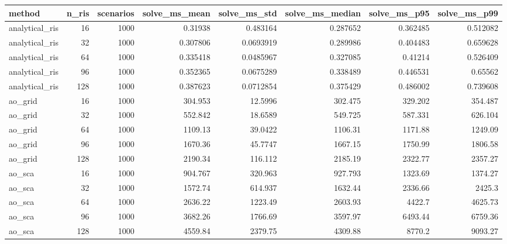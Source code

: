 \begin{tabular}{lrrrrrrr}
\toprule
method & n_ris & scenarios & solve_ms_mean & solve_ms_std & solve_ms_median & solve_ms_p95 & solve_ms_p99 \\
\midrule
analytical_ris & 16 & 1000 & 0.31938 & 0.483164 & 0.287652 & 0.362485 & 0.512082 \\
analytical_ris & 32 & 1000 & 0.307806 & 0.0693919 & 0.289986 & 0.404483 & 0.659628 \\
analytical_ris & 64 & 1000 & 0.335418 & 0.0485967 & 0.327085 & 0.41214 & 0.526409 \\
analytical_ris & 96 & 1000 & 0.352365 & 0.0675289 & 0.338489 & 0.446531 & 0.65562 \\
analytical_ris & 128 & 1000 & 0.387623 & 0.0712854 & 0.375429 & 0.486002 & 0.739608 \\
ao_grid & 16 & 1000 & 304.953 & 12.5996 & 302.475 & 329.202 & 354.487 \\
ao_grid & 32 & 1000 & 552.842 & 18.6589 & 549.725 & 587.331 & 626.104 \\
ao_grid & 64 & 1000 & 1109.13 & 39.0422 & 1106.31 & 1171.88 & 1249.09 \\
ao_grid & 96 & 1000 & 1670.36 & 45.7747 & 1667.15 & 1750.99 & 1806.58 \\
ao_grid & 128 & 1000 & 2190.34 & 116.112 & 2185.19 & 2322.77 & 2357.27 \\
ao_sca & 16 & 1000 & 904.767 & 320.963 & 927.793 & 1323.69 & 1374.27 \\
ao_sca & 32 & 1000 & 1572.74 & 614.937 & 1632.44 & 2336.66 & 2425.3 \\
ao_sca & 64 & 1000 & 2636.22 & 1223.49 & 2603.93 & 4422.7 & 4625.73 \\
ao_sca & 96 & 1000 & 3682.26 & 1766.69 & 3597.97 & 6493.44 & 6759.36 \\
ao_sca & 128 & 1000 & 4559.84 & 2379.75 & 4309.88 & 8770.2 & 9093.27 \\
\bottomrule
\end{tabular}
